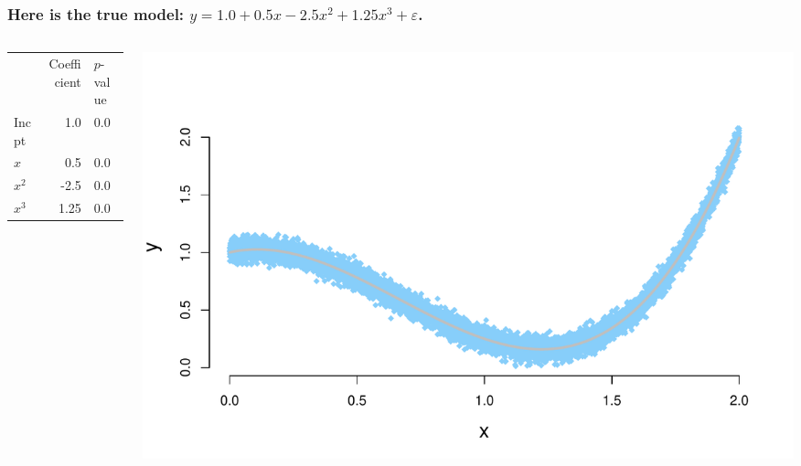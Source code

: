 \documentclass[aspectratio=169]{beamer}
\theoremstyle{principle}
\begin{document}
\begin{frame}
\frametitle{Here is the true model: $y=1.0 + 0.5x - 2.5x^2 + 1.25x^3 + \varepsilon$.}

\begin{columns}
\begin{column}{0.3\textwidth}

\begin{center}
\begin{tabular}{ lrl } 
\hline
\hline
 & Coefficient & $p$-value\\ 
Incpt & 1.0 &0.0\\ 
$x$ & 0.5 &0.0\\ 
$x^2$ & -2.5 &0.0\\ 
$x^3$ & 1.25 &0.0\\ 
\hline
\hline
\end{tabular}
\end{center}

\end{column}
\begin{column}{0.7\textwidth}

\begin{center}
\includegraphics[scale=0.5]{crazy_curve_x3.pdf}
\end{center}

\end{column}
\end{columns}

\end{frame}

%
\end{document}
